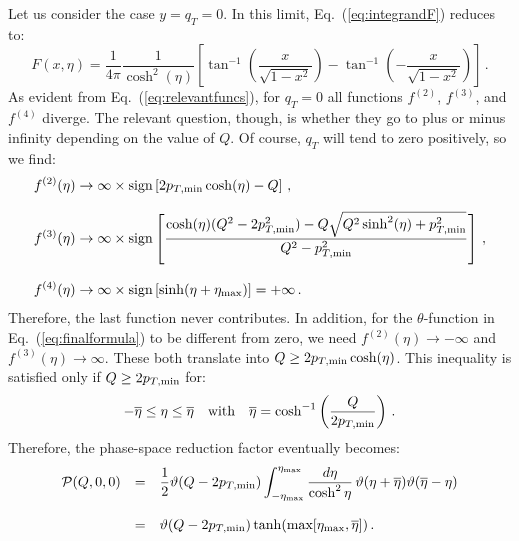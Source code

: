 \documentclass[10pt,a4paper]{article}
\begin{document}
Let us consider the case $y=q_T=0$. In this limit,
Eq.~(\ref{eq:integrandF}) reduces to:
\begin{equation}
F(x,\eta)=\displaystyle \frac{1}{4\pi}\frac{1}{\cosh^2(\eta)}\left[\tan^{-1}\left(\frac{
    x}{\sqrt{1-x^2}}\right)-\displaystyle\tan^{-1}\left(-\frac{
    x}{\sqrt{1-x^2}}\right)\right]\,.
\end{equation}
As evident from Eq.~(\ref{eq:relevantfuncs}), for $q_T=0$ all
functions $f^{(2)}$, $f^{(3)}$, and $f^{(4)}$ diverge. The relevant
question, though, is whether they go to plus or minus infinity
depending on the value of $Q$. Of course, $q_T$ will tend to zero
positively, so we find:
\begin{equation}
\begin{array}{l}
\displaystyle f^{(2)}(\eta)\rightarrow \infty\times\mbox{sign}\left[2 p_{T,\rm min}\cosh(\eta)-Q\right]\,,\\
\\
\displaystyle f^{(3)}(\eta) \rightarrow \infty\times\mbox{sign}\left[\frac{\cosh(\eta)(Q^2 - 2
                    p_{T,\rm min}^{2})- Q\sqrt{Q^{2} \sinh^{2}(\eta) + p_{T,\rm min}^{2} }}{Q^{2} - p_{T,\rm min}^{2}}\right]\,, \\
\\
\displaystyle f^{(4)}(\eta) \rightarrow \infty\times\mbox{sign}\left[\sinh(\eta +\eta_{\rm max})\right]=+\infty\,.
\end{array}
\end{equation}
Therefore, the last function never contributes. In addition, for the
$\theta$-function in Eq.~(\ref{eq:finalformula}) to be different from
zero, we need $f^{(2)}(\eta)\rightarrow -\infty$ and
$f^{(3)}(\eta)\rightarrow \infty$. These both translate into
$Q\geq 2 p_{T,\rm min}\cosh(\eta)$. This inequality is
satisfied only if $Q\geq 2p_{T,\rm min}$ for:
\begin{equation}
-\overline{\eta}\leq\eta\leq \overline{\eta}\quad\mbox{with}\quad \overline{\eta} =\cosh^{-1}\left(\frac{Q}{2p_{T,\rm min}}\right)\,.
\end{equation}
Therefore, the phase-space reduction factor eventually becomes:
\begin{equation}
\begin{array}{rcl}
  \mathcal{P}(Q,0,0)&=&\displaystyle\frac12\vartheta(Q- 2p_{T,\rm min})\displaystyle \int_{-\eta_{\rm
      max}}^{\eta_{\rm
      max}}\frac{d\eta}{\cosh^2\eta}\,\vartheta(\eta+\overline{\eta})
  \vartheta(\overline{\eta}-\eta)\\
\\
&=&\displaystyle\vartheta(Q- 2p_{T,\rm
    min})\tanh(\mbox{max}[\eta_{\rm max},\overline{\eta}])\,.
\end{array}
\end{equation}
\end{document}
